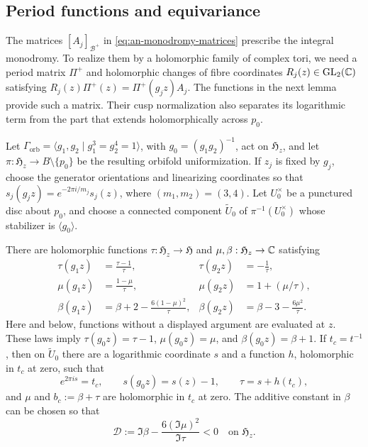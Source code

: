 \subsection{Period functions and equivariance}

The matrices $[A_j]_{\mathcal B^+}$ in
\eqref{eq:an-monodromy-matrices} prescribe the integral monodromy.  To
realize them by a holomorphic family of complex tori, we need a period matrix
$\Pi^+$ and
holomorphic changes of fibre coordinates $R_j(z)\in\operatorname{GL}_2(\mathbb C)$
satisfying $R_j(z)\Pi^+(z)=\Pi^+(g_jz)A_j$.
The functions in the next lemma provide such a matrix.  Their cusp
normalization also separates its logarithmic term from the part that extends
holomorphically across $p_0$.

Let $\Gamma_{\mathrm{orb}}
=\langle g_1,g_2\mid g_1^3=g_2^4=1\rangle$, with
$g_0=(g_1g_2)^{-1}$, act on $\mathfrak H_z$, and let
$\pi:\mathfrak H_z\to B\setminus\{p_0\}$ be the resulting orbifold
uniformization.  If $z_j$ is fixed by
$g_j$, choose the generator orientations and linearizing coordinates so
that $s_j(g_jz)=e^{-2\pi i/m_j}s_j(z)$, where
$(m_1,m_2)=(3,4)$.
Let $U_0^\times$ be a punctured disc about $p_0$, and choose a connected
component $\widetilde U_0$ of $\pi^{-1}(U_0^\times)$ whose stabilizer is
$\langle g_0\rangle$.

\begin{lemma}\label{lem:an-period-functions}
There are holomorphic functions
$\tau:\mathfrak H_z\to\mathfrak H$ and
$\mu,\beta:\mathfrak H_z\to\mathbb C$ satisfying
\begin{align}
 \tau(g_1z)&=\frac{\tau-1}{\tau},
 &\tau(g_2z)&=-\frac1\tau,\label{eq:an-tau-laws}\\
 \mu(g_1z)&=\frac{1-\mu}{\tau},
 &\mu(g_2z)&=1+(\mu/\tau),\label{eq:an-mu-laws}\\
 \beta(g_1z)&=\beta+2-\frac{6(1-\mu)^2}{\tau},
 &\beta(g_2z)&=\beta-3-\frac{6\mu^2}{\tau}.
 \label{eq:an-beta-laws}
\end{align}
Here and below, functions without a displayed argument are evaluated at
$z$.  These laws imply $\tau(g_0z)=\tau-1$,
$\mu(g_0z)=\mu$, and $\beta(g_0z)=\beta+1$.
If $t_c=t^{-1}$, then on $\widetilde U_0$ there are a
logarithmic coordinate $s$ and a function $h$, holomorphic in $t_c$
at zero, such that
\begin{equation}\label{eq:an-log-coordinate}
 e^{2\pi is}=t_c,
 \qquad s(g_0z)=s(z)-1,
 \qquad \tau=s+h(t_c),
\end{equation}
and $\mu$ and $b_c:=\beta+\tau$ are holomorphic in $t_c$ at zero.
The additive constant in $\beta$ can be chosen so that
\begin{equation}\label{eq:an-D-negative}
 \mathcal D:=\Im\beta-\frac{6(\Im\mu)^2}{\Im\tau}<0
 \quad\text{on }\mathfrak H_z.
\end{equation}
\end{lemma}

